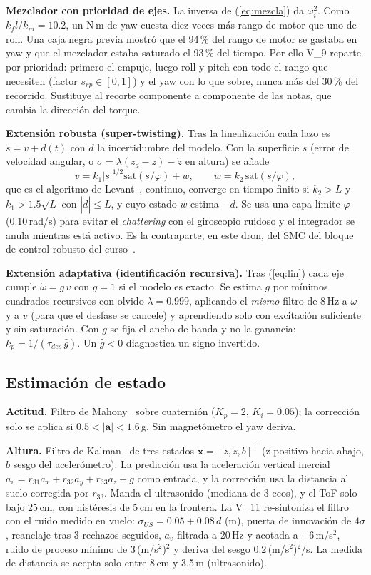 \textbf{Mezclador con prioridad de ejes.} La inversa de (\ref{eq:mezcla}) da $\omega_i^2$. Como $k_fl/k_m=10.2$, un N\,m de yaw cuesta diez veces más rango de motor que uno de roll. Una caja negra previa mostró que el 94\,\% del rango de motor se gastaba en yaw y que el mezclador estaba saturado el 93\,\% del tiempo. Por ello V\_9 reparte por prioridad: primero el empuje, luego roll y pitch con todo el rango que necesiten (factor $s_{rp}\in[0,1]$) y el yaw con lo que sobre, nunca más del 30\,\% del recorrido. Sustituye al recorte componente a componente de las notas, que cambia la dirección del torque.

\textbf{Extensión robusta (super-twisting).} Tras la linealización cada lazo es $\dot s=v+d(t)$ con $d$ la incertidumbre del modelo. Con la superficie $s$ (error de velocidad angular, o $\sigma=\lambda(z_d-z)-\dot z$ en altura) se añade
\begin{equation}
v=k_1|s|^{1/2}\mathrm{sat}(s/\varphi)+w,\qquad \dot w=k_2\,\mathrm{sat}(s/\varphi),
\label{eq:st}
\end{equation}
que es el algoritmo de Levant~\cite{levant}, continuo, converge en tiempo finito si $k_2>L$ y $k_1>1.5\sqrt L$ con $|\dot d|\le L$, y cuyo estado $w$ estima $-d$. Se usa una capa límite $\varphi$ (0.10\,rad/s) para evitar el \emph{chattering} con el giroscopio ruidoso y el integrador se anula mientras está activo. Es la contraparte, en este dron, del SMC del bloque de control robusto del curso~\cite{notas2}.

\textbf{Extensión adaptativa (identificación recursiva).} Tras (\ref{eq:lin}) cada eje cumple $\dot\omega=g\,v$ con $g=1$ si el modelo es exacto. Se estima $g$ por mínimos cuadrados recursivos con olvido $\lambda=0.999$, aplicando el \emph{mismo} filtro de 8\,Hz a $\dot\omega$ y a $v$ (para que el desfase se cancele) y aprendiendo solo con excitación suficiente y sin saturación. Con $g$ se fija el ancho de banda y no la ganancia: $k_p=1/(\tau_{des}\,\hat g)$. Un $\hat g<0$ diagnostica un signo invertido.

\subsection{Estimación de estado}
\textbf{Actitud.} Filtro de Mahony~\cite{mahony} sobre cuaternión ($K_p=2$, $K_i=0.05$); la corrección solo se aplica si $0.5<|\bm a|<1.6$\,g. Sin magnetómetro el yaw deriva.

\textbf{Altura.} Filtro de Kalman~\cite{kalman} de tres estados $\bm x=[z,\dot z,b]^\top$ (z positivo hacia abajo, $b$ sesgo del acelerómetro). La predicción usa la aceleración vertical inercial $a_v=r_{31}a_x+r_{32}a_y+r_{33}a_z+g$ como entrada, y la corrección usa la distancia al suelo corregida por $r_{33}$. Manda el ultrasonido (mediana de 3 ecos), y el ToF solo bajo 25\,cm, con histéresis de 5\,cm en la frontera. La V\_11 re-sintoniza el filtro con el ruido medido en vuelo: $\sigma_{US}=0.05+0.08\,d$ (m), puerta de innovación de $4\sigma$, reanclaje tras 3 rechazos seguidos, $a_v$ filtrada a 20\,Hz y acotada a $\pm6$\,m/s$^2$, ruido de proceso mínimo de 3\,(m/s$^2$)$^2$ y deriva del sesgo $0.2$\,(m/s$^2$)$^2$/s. La medida de distancia se acepta solo entre 8\,cm y 3.5\,m (ultrasonido).

